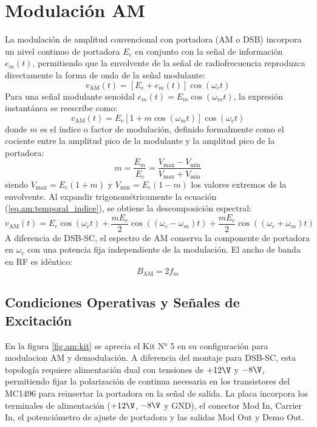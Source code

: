 \chapter{Modulación AM}
\label{sec.ej3:am}

La modulación de amplitud convencional con portadora (AM o DSB) incorpora un nivel continuo de portadora
$E_c$ en conjunto con la señal de información $e_m(t)$, permitiendo que la envolvente de la señal de radiofrecuencia
reproduzca directamente la forma de onda de la señal modulante:
\begin{equation}
    v_{\mathrm{AM}}(t) = \left[E_c + e_m(t)\right] \cos(\omega_c t)
    \label{eq.am:temporal_gral}
\end{equation}
Para una señal modulante senoidal $e_m(t) = E_m \cos(\omega_m t)$, la expresión instantánea se reescribe como:
\begin{equation}
    v_{\mathrm{AM}}(t) = E_c \left[1 + m \cos(\omega_m t)\right] \cos(\omega_c t)
    \label{eq.am:temporal_indice}
\end{equation}
donde $m$ es el índice o factor de modulación, definido formalmente como el cociente entre la amplitud pico de la
modulante y la amplitud pico de la portadora:
\begin{equation}
    m = \frac{E_m}{E_c} = \frac{V_{\mathrm{max}} - V_{\mathrm{min}}}{V_{\mathrm{max}} + V_{\mathrm{min}}}
    \label{eq.am:indice_mod}
\end{equation}
siendo $V_{\mathrm{max}} = E_c (1 + m)$ y $V_{\mathrm{min}} = E_c (1 - m)$ los valores extremos de la envolvente.
Al expandir trigonométricamente la ecuación (\ref{eq.am:temporal_indice}), se obtiene la descomposición espectral:
\begin{equation}
    v_{\mathrm{AM}}(t) = E_c \cos(\omega_c t) + \frac{m E_c}{2} \cos\left((\omega_c - \omega_m)t\right) + \frac{m E_c}{2} \cos\left((\omega_c + \omega_m)t\right)
    \label{eq.am:espectro}
\end{equation}
A diferencia de DSB-SC, el espectro de AM conserva la componente de portadora en $\omega_c$ con una potencia fija
independiente de la modulación. El ancho de banda en RF es idéntico:
\begin{equation*}
    B_{\mathrm{AM}} = 2 f_m
\end{equation*}

\section{Condiciones Operativas y Señales de Excitación}
En la figura \ref{fig.am:kit} se aprecia el Kit N° 5 en su configuración para modulacion AM y demodulación. A diferencia
del montaje para DSB-SC, esta topología requiere alimentación dual con tensiones de $+12\V$ y $-8\V$, permitiendo fijar
la polarización de continua necesaria en los transistores del MC1496 para reinsertar la portadora en la señal de salida.
La placa incorpora los terminales de alimentación ($+12\V$, $-8\V$ y GND), el conector Mod In, Carrier In, el
potenciómetro de ajuste de portadora y las salidas Mod Out y Demo Out.

